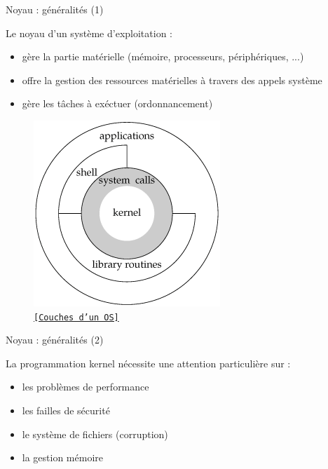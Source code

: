 \documentclass[12pt, t]{beamer}
\newcommand{\bi}{\begin{itemize}}
\newcommand{\ei}{\end{itemize}}
\newcommand{\src}[2]{\vspace{-10pt}\caption{\href{#1}{\centering \tt \tiny [#2]}}}
\begin{document}
\begin{frame}{Noyau : généralités (1)}

    \vspace{5pt}
    Le noyau d'un système d'exploitation :
    \vspace{3pt}
    \bi
    \itemsep4pt
    \item gère la partie matérielle (mémoire, processeurs, périphériques, ...)
    \item offre la gestion des ressources matérielles à travers des appels
          système
    \item gère les tâches à exéctuer (ordonnancement)
    \ei

    {
        \begin{figure}
            \centering
            \includegraphics[scale=0.5]{kernel.png}
            \src{https://dimaslviv.wordpress.com/author/dimaslviv/}{Couches d'un OS}
        \end{figure}
    }

\end{frame}

\begin{frame}{Noyau : généralités (2)}

    \vspace{15pt}
    La programmation kernel nécessite une attention particulière sur :
    \vspace{8pt}
    \bi
    \itemsep12pt
    \item les problèmes de performance
    \item les failles de sécurité
    \item le système de fichiers (corruption)
    \item la gestion mémoire
    \ei

\end{frame}
\end{document}
